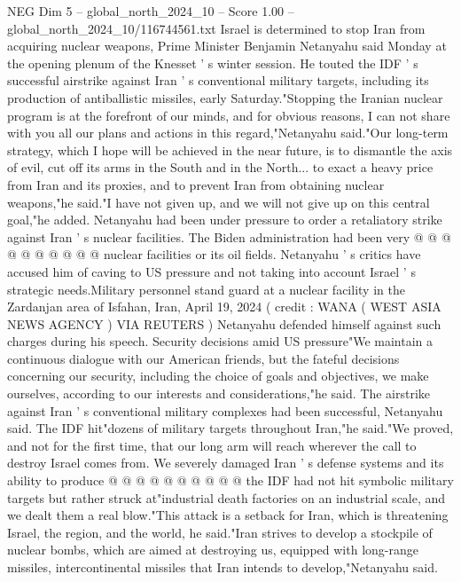 \begin{textsample}{NEG Dim 5 – global\_north\_2024\_10 – Score 1.00 – global\_north\_2024\_10/116744561.txt}  \label{ex:f5_neg_049}
Israel is determined to stop Iran from acquiring nuclear weapons, Prime Minister Benjamin Netanyahu said Monday at the opening plenum of the Knesset ' s winter session.
He touted the IDF ' s successful airstrike against Iran ' s conventional military targets, including its production of antiballistic missiles, early Saturday."Stopping the Iranian nuclear program is at the forefront of our minds, and for obvious reasons, I can not share with you all our plans and actions in this regard,"Netanyahu said."Our long-term strategy, which I hope will be achieved in the near future, is to dismantle the axis of evil, cut off its arms in the South and in the North... to exact a heavy price from Iran and its proxies, and to prevent Iran from obtaining nuclear weapons,"he said."I have not given up, and we will not give up on this central goal,"he added.
Netanyahu had been under pressure to order a retaliatory strike against Iran ' s nuclear facilities.
The Biden administration had been very @ @ @ @ @ @ @ @ @ @ nuclear facilities or its oil fields.
Netanyahu ' s critics have accused him of caving to US pressure and not taking into account Israel ' s strategic needs.Military personnel stand guard at a nuclear facility in the Zardanjan area of Isfahan, Iran, April 19, 2024 ( credit : WANA ( WEST ASIA NEWS AGENCY ) VIA REUTERS ) Netanyahu defended himself against such charges during his speech.
Security decisions amid US pressure"We maintain a continuous dialogue with our American friends, but the fateful decisions concerning our security, including the choice of goals and objectives, we make ourselves, according to our interests and considerations,"he said.
The airstrike against Iran ' s conventional military complexes had been successful, Netanyahu said.
The IDF hit"dozens of military targets throughout Iran,"he said."We proved, and not for the first time, that our long arm will reach wherever the call to destroy Israel comes from.
We severely damaged Iran ' s defense systems and its ability to produce @ @ @ @ @ @ @ @ @ @ the IDF had not hit symbolic military targets but rather struck at"industrial death factories on an industrial scale, and we dealt them a real blow."This attack is a setback for Iran, which is threatening Israel, the region, and the world, he said."Iran strives to develop a stockpile of nuclear bombs, which are aimed at destroying us, equipped with long-range missiles, intercontinental missiles that Iran intends to develop,"Netanyahu said.

\end{textsample}
